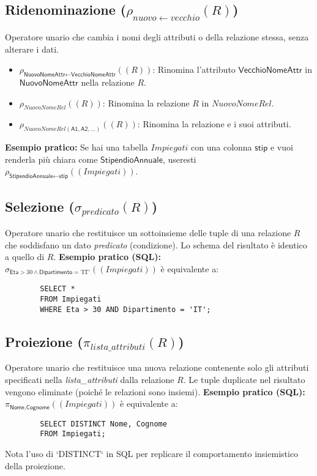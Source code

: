 \documentclass{article}
\newcommand{\Rel}[1]{\textit{#1}} %
\newcommand{\Attr}[1]{\textsf{#1}} %
\newcommand{\myrename}[2]{\rho_{#1}(#2)}
\newcommand{\myselectop}[2]{\sigma_{#1}(#2)}
\newcommand{\myproject}[2]{\pi_{#1}(#2)}
\newcommand{\mylandop}{\wedge}
\begin{document}
	\subsection{Ridenominazione ($\myrename{nuovo \leftarrow vecchio}{R}$)}
	Operatore unario che cambia i nomi degli attributi o della relazione stessa, senza alterare i dati.
	\begin{itemize}
		\item $\myrename{\Attr{NuovoNomeAttr} \leftarrow \Attr{VecchioNomeAttr}}{(\Rel{R})}$: Rinomina l'attributo $\Attr{VecchioNomeAttr}$ in $\Attr{NuovoNomeAttr}$ nella relazione $\Rel{R}$.
		\item $\myrename{\Rel{NuovoNomeRel}}{(\Rel{R})}$: Rinomina la relazione $\Rel{R}$ in $\Rel{NuovoNomeRel}$.
		\item $\myrename{\Rel{NuovoNomeRel}(\Attr{A1}, \Attr{A2}, \dots)}{(\Rel{R})}$: Rinomina la relazione e i suoi attributi.
	\end{itemize}
	\textbf{Esempio pratico:} Se hai una tabella $\Rel{Impiegati}$ con una colonna $\Attr{stip}$ e vuoi renderla più chiara come $\Attr{StipendioAnnuale}$, useresti $\myrename{\Attr{StipendioAnnuale} \leftarrow \Attr{stip}}{(\Rel{Impiegati})}$.
	
	\subsection{Selezione ($\myselectop{predicato}{R}$)}
	Operatore unario che restituisce un sottoinsieme delle tuple di una relazione $\Rel{R}$ che soddisfano un dato \textit{predicato} (condizione).
	Lo schema del risultato è identico a quello di $\Rel{R}$.
	\textbf{Esempio pratico (SQL):}
	$\myselectop{\Attr{Eta} > 30 \mylandop \Attr{Dipartimento} = \text{'IT'}}{(\Rel{Impiegati})}$
	è equivalente a:
	\begin{verbatim}
		SELECT *
		FROM Impiegati
		WHERE Eta > 30 AND Dipartimento = 'IT';
	\end{verbatim}
	
	\subsection{Proiezione ($\myproject{lista\_attributi}{R}$)}
	Operatore unario che restituisce una nuova relazione contenente solo gli attributi specificati nella \textit{lista\_attributi} dalla relazione $\Rel{R}$.
	Le tuple duplicate nel risultato vengono eliminate (poiché le relazioni sono insiemi).
	\textbf{Esempio pratico (SQL):}
	$\myproject{\Attr{Nome}, \Attr{Cognome}}{(\Rel{Impiegati})}$
	è equivalente a:
	\begin{verbatim}
		SELECT DISTINCT Nome, Cognome
		FROM Impiegati;
	\end{verbatim}
	Nota l'uso di `DISTINCT` in SQL per replicare il comportamento insiemistico della proiezione.
	
\end{document}
